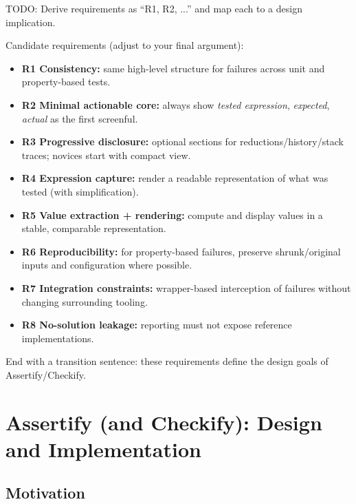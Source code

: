 \documentclass[
	bibliography=totoc,
	listof=totoc,
]{scrbook}
\begin{document}
\begin{marker}\begin{justify}
TODO: Derive requirements as ``R1, R2, ...'' and map each to a design implication.

Candidate requirements (adjust to your final argument):
\begin{itemize}
    \item \textbf{R1 Consistency:} same high-level structure for failures across unit and property-based tests.
    \item \textbf{R2 Minimal actionable core:} always show \emph{tested expression}, \emph{expected}, \emph{actual} as the first screenful.
    \item \textbf{R3 Progressive disclosure:} optional sections for reductions/history/stack traces; novices start with compact view.
    \item \textbf{R4 Expression capture:} render a readable representation of what was tested (with simplification).
    \item \textbf{R5 Value extraction + rendering:} compute and display values in a stable, comparable representation.
    \item \textbf{R6 Reproducibility:} for property-based failures, preserve shrunk/original inputs and configuration where possible.
    \item \textbf{R7 Integration constraints:} wrapper-based interception of failures without changing surrounding tooling.
    \item \textbf{R8 No-solution leakage:} reporting must not expose reference implementations.
\end{itemize}

End with a transition sentence: these requirements define the design goals of Assertify/Checkify.
\end{justify}\end{marker}


\pagebreak %
\chapter{Assertify (and Checkify): Design and Implementation} %
\section*{Motivation} %
\end{document}
